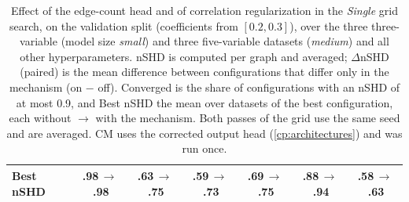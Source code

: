 \begin{table}[ht]
\begin{tabular}{lccccc|c}
        \quad Best nSHD & .98\,$\to$\,.98 & .63\,$\to$\,.75 & .59\,$\to$\,.73 & .69\,$\to$\,.75 & .88\,$\to$\,.94 & .58\,$\to$\,.63 \\
    \bottomrule
    \end{tabular}
    \caption{Effect of the edge-count head and of correlation regularization in the \emph{Single} grid search, on the validation split (coefficients from $[0.2,0.3]$), over the three three-variable (model size \emph{small}) and three five-variable datasets (\emph{medium}) and all other hyperparameters. nSHD is computed per graph and averaged; $\Delta$nSHD (paired) is the mean difference between configurations that differ only in the mechanism (on $-$ off). Converged is the share of configurations with an nSHD of at most 0.9, and Best nSHD the mean over datasets of the best configuration, each without $\to$ with the mechanism. Both passes of the grid use the same seed and are averaged. CM uses the corrected output head (\cref{cp:architectures}) and was run once.}
    \label{tab:cp:helpers:nshd}
\end{table}
